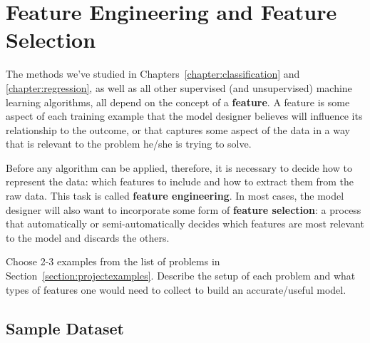 \chapter{Feature Engineering and Feature Selection \label{chapter:featureengineering}}

The methods we've studied in Chapters~\ref{chapter:classification} and \ref{chapter:regression}, as well as all other supervised (and unsupervised) machine learning algorithms, all depend on the concept of a \textbf{feature}. A feature is some aspect of each training example that the model designer believes will influence its relationship to the outcome, or that captures some aspect of the data in a way that is relevant to the problem he/she is trying to solve. 

Before any algorithm can be applied, therefore, it is necessary to decide how to represent the data: which features to include and how to extract them from the raw data. This task is called \textbf{feature engineering}. In most cases, the model designer will also want to incorporate some form of \textbf{feature selection}: a process that automatically or semi-automatically decides which features are most relevant to the model and discards the others.

\vspace{5mm}

\begin{question}{}
Choose 2-3 examples from the list of problems in Section~\ref{section:projectexamples}. Describe the setup of each problem and what types of features one would need to collect to build an accurate/useful model. 
\end{question}


\section{Sample Dataset}

